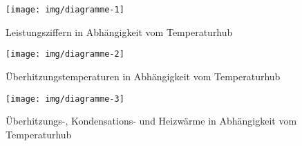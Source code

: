 \begin{figure}[h!]
	\centering
	\texttt{[image: img/diagramme-1]}
	\caption{Leistungsziffern in Abhängigkeit vom Temperaturhub}
	\label{dia:lz_t}
\end{figure}
\FloatBarrier
\begin{figure}[h!]
	\centering
	\texttt{[image: img/diagramme-2]}
	\caption{Überhitzungstemperaturen in Abhängigkeit vom Temperaturhub}
	\label{dia:tu_t}
\end{figure}
\FloatBarrier
\begin{figure}[h!]
	\centering
	\texttt{[image: img/diagramme-3]}
	\caption{Überhitzungs-, Kondensations- und Heizwärme in Abhängigkeit vom Temperaturhub}
	\label{dia:q_t}
\end{figure}
\FloatBarrier

